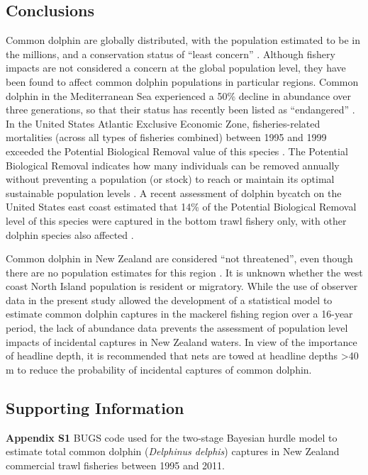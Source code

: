 \documentclass[10pt]{article}
\begin{document}
\subsection*{Conclusions}
Common dolphin are globally distributed, with the population estimated
to be in the millions, and a conservation status of ``least concern''
\cite{hammond_delphinus_2008}.  Although fishery impacts are not
considered a concern at the global population level, they have been
found to affect common dolphin populations in particular regions.
Common dolphin in the Mediterranean Sea experienced a 50\% decline in
abundance over three generations, so that their status has recently
been listed as ``endangered'' \cite{bearzi_overfishing_2008}.  In the United States Atlantic Exclusive Economic Zone, fisheries-related mortalities (across all types of fisheries combined) between 1995 and 1999 exceeded the Potential Biological Removal value of this species \cite{waring_stock_2001}. The Potential Biological Removal indicates how many individuals can be removed annually without preventing a population (or stock) to reach or maintain its optimal sustainable population levels \cite{wade_calculating_1998}. A recent assessment of dolphin bycatch on the United States east coast estimated that 14\% of the Potential Biological Removal level of this species were captured in the bottom trawl fishery only, with other dolphin species also affected \cite{rossman_estimated_2010}. 

Common dolphin in New Zealand are considered ``not threatened'', even though there are no population estimates for this region \cite{ stockin_status_2009, baker_marinemammals_2010}. It is unknown whether the west coast North Island population is resident or migratory. While the use of observer data in the present study allowed the development of a statistical model to estimate common dolphin captures in the mackerel fishing region over a 16-year period, the lack of abundance data prevents the assessment of population level impacts of incidental captures in New Zealand waters. In view of the importance of headline depth, it is recommended that nets are towed at headline depths \textgreater40 m to reduce the probability of incidental captures of common dolphin.

\subsection*{Supporting Information}
{\bfseries Appendix S1}
BUGS code used for the  two-stage Bayesian hurdle model to estimate total common dolphin (\emph{Delphinus delphis}) captures in New Zealand commercial trawl fisheries between 1995 and 2011.
\end{document}
